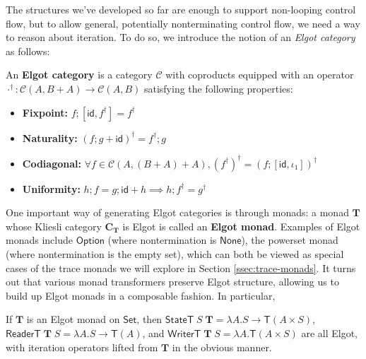 \documentclass[acmsmall,screen,review]{acmart}
\newcommand{\mc}[1]{\ensuremath{\mathcal{#1}}}
\newcommand{\mb}[1]{\ensuremath{\mathbf{#1}}}
\newcommand{\ms}[1]{\ensuremath{\mathsf{#1}}}
\begin{document}
The structures we've developed so far are enough to support non-looping control
flow, but to allow general, potentially nonterminating control flow, we need a
way to reason about iteration. To do so, we introduce the notion of an
\textit{Elgot category} as follows:
\begin{definition} 
  An \textbf{Elgot category} is a category \(\mc{C}\) with coproducts equipped
  with an operator \(\cdot^\dagger: \mc{C}(A, B + A) \to \mc{C}(A, B)\)
  satisfying the following properties:
  \begin{itemize}
    \item \textbf{Fixpoint:} \(f;[\ms{id}, f^\dagger] = f^\dagger\)
    \item \textbf{Naturality:} \((f;g + \ms{id})^\dagger = f^\dagger;g\)
    \item \textbf{Codiagonal:} \(\forall f \in \mc{C}(A, (B + A) + A), (f^\dagger)^\dagger = (f;[\ms{id}, \iota_1])^\dagger\)
    \item \textbf{Uniformity:}
    \(
      h;f = g;\ms{id} + h \implies h;f^\dagger = g^\dagger
    \)
  \end{itemize}
\end{definition}

One important way of generating Elgot categories is through monads: a monad
\(\mb{T}\) whose Kliesli category \(\mb{C}_{\mb{T}}\) is Elgot is called an
\textbf{Elgot monad}. Examples of Elgot monads include \(\ms{Option}\) (where
nontermination is \(\ms{None}\)), the powerset monad (where nontermination is
the empty set), which can both be viewed as special cases of the trace monads we
will explore in Section \ref{ssec:trace-monads}. It turns out that various monad
transformers preserve Elgot structure, allowing us to build up Elgot monads in a
composable fashion. In particular,
\begin{proposition}
  If \(\mb{T}\) is an Elgot monad on \(\ms{Set}\), then \(\ms{StateT}\;S\;\mb{T}
  = \lambda A. S \to \ms{T}(A \times S)\), \(\ms{ReaderT}\;\mb{T}\;S = \lambda
  A. S \to \ms{T}(A)\), and \(\ms{WriterT}\;\mb{T}\;S = \lambda A. \ms{T}(A
  \times S)\) are all Elgot, with iteration operators lifted from \(\mb{T}\) in
  the obvious manner.
\end{proposition}
\end{document}

